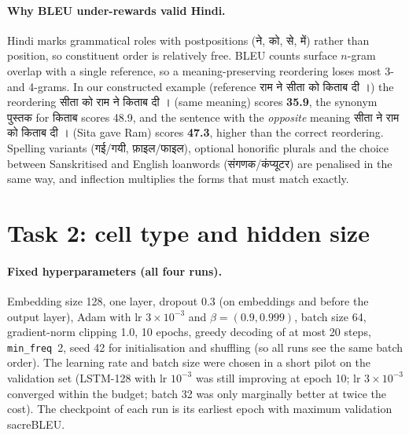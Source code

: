 \documentclass[10pt,a4paper]{article}
\newcommand{\hi}[1]{{\hindifont #1}}
\newcommand{\code}[1]{\texttt{#1}}
\begin{document}
\paragraph{Why BLEU under-rewards valid Hindi.} Hindi marks grammatical roles with postpositions
(\hi{ने}, \hi{को}, \hi{से}, \hi{में}) rather than position, so constituent order is relatively free. BLEU
counts surface $n$-gram overlap with a single reference, so a meaning-preserving reordering loses most 3- and
4-grams. In our constructed example (reference \hi{राम ने सीता को किताब दी ।}) the reordering
\hi{सीता को राम ने किताब दी ।} (same meaning) scores \textbf{35.9}, the synonym \hi{पुस्तक} for \hi{किताब}
scores 48.9, and the sentence with the \emph{opposite} meaning \hi{सीता ने राम को किताब दी ।} (Sita gave
Ram) scores \textbf{47.3}, higher than the correct reordering. Spelling variants (\hi{गई/गयी},
\hi{फ़ाइल/फाइल}), optional honorific plurals and the choice between Sanskritised and English loanwords
(\hi{संगणक/कंप्यूटर}) are penalised in the same way, and inflection multiplies the forms that must match
exactly.

\section{Task 2: cell type and hidden size}

\paragraph{Fixed hyperparameters (all four runs).} Embedding size 128, one layer, dropout 0.3 (on
embeddings and before the output layer), Adam with lr $3\times10^{-3}$ and $\beta=(0.9,0.999)$, batch size
64, gradient-norm clipping 1.0, 10 epochs, greedy decoding of at most 20 steps, \code{min\_freq}~2, seed 42
for initialisation and shuffling (so all runs see the same batch order). The learning rate and batch size were
chosen in a short pilot on the validation set (LSTM-128 with lr $10^{-3}$ was still improving at epoch 10;
lr $3\times10^{-3}$ converged within the budget; batch 32 was only marginally better at twice the cost).
The checkpoint of each run is its earliest epoch with maximum validation sacreBLEU.
\end{document}
